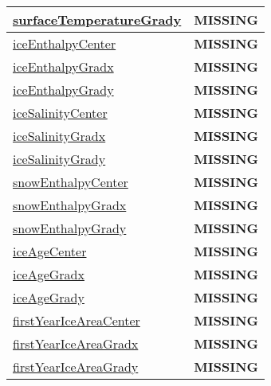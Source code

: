 {\begin{center}
\begin{longtable}{| p{2.0in} | p{4.0in} |}
    \hline
    \hyperref[subsec:var_sec_tracer_reconstruction_surfaceTemperatureGrady]{surfaceTemperatureGrady} & {\bf \color{red} MISSING} \\
    \hline
    \hyperref[subsec:var_sec_tracer_reconstruction_iceEnthalpyCenter]{iceEnthalpyCenter} & {\bf \color{red} MISSING} \\
    \hline
    \hyperref[subsec:var_sec_tracer_reconstruction_iceEnthalpyGradx]{iceEnthalpyGradx} & {\bf \color{red} MISSING} \\
    \hline
    \hyperref[subsec:var_sec_tracer_reconstruction_iceEnthalpyGrady]{iceEnthalpyGrady} & {\bf \color{red} MISSING} \\
    \hline
    \hyperref[subsec:var_sec_tracer_reconstruction_iceSalinityCenter]{iceSalinityCenter} & {\bf \color{red} MISSING} \\
    \hline
    \hyperref[subsec:var_sec_tracer_reconstruction_iceSalinityGradx]{iceSalinityGradx} & {\bf \color{red} MISSING} \\
    \hline
    \hyperref[subsec:var_sec_tracer_reconstruction_iceSalinityGrady]{iceSalinityGrady} & {\bf \color{red} MISSING} \\
    \hline
    \hyperref[subsec:var_sec_tracer_reconstruction_snowEnthalpyCenter]{snowEnthalpyCenter} & {\bf \color{red} MISSING} \\
    \hline
    \hyperref[subsec:var_sec_tracer_reconstruction_snowEnthalpyGradx]{snowEnthalpyGradx} & {\bf \color{red} MISSING} \\
    \hline
    \hyperref[subsec:var_sec_tracer_reconstruction_snowEnthalpyGrady]{snowEnthalpyGrady} & {\bf \color{red} MISSING} \\
    \hline
    \hyperref[subsec:var_sec_tracer_reconstruction_iceAgeCenter]{iceAgeCenter} & {\bf \color{red} MISSING} \\
    \hline
    \hyperref[subsec:var_sec_tracer_reconstruction_iceAgeGradx]{iceAgeGradx} & {\bf \color{red} MISSING} \\
    \hline
    \hyperref[subsec:var_sec_tracer_reconstruction_iceAgeGrady]{iceAgeGrady} & {\bf \color{red} MISSING} \\
    \hline
    \hyperref[subsec:var_sec_tracer_reconstruction_firstYearIceAreaCenter]{firstYearIceAreaCenter} & {\bf \color{red} MISSING} \\
    \hline
    \hyperref[subsec:var_sec_tracer_reconstruction_firstYearIceAreaGradx]{firstYearIceAreaGradx} & {\bf \color{red} MISSING} \\
    \hline
    \hyperref[subsec:var_sec_tracer_reconstruction_firstYearIceAreaGrady]{firstYearIceAreaGrady} & {\bf \color{red} MISSING} \\

\end{longtable}
\end{center}}
